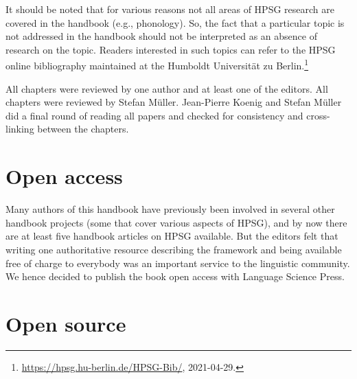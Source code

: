 \begin{refsection}
It should be noted that for various reasons not all areas of HPSG research are covered in the
handbook (e.g., phonology). So, the fact that a particular topic is not addressed in the handbook
should not be interpreted as an absence of research on the topic. Readers interested in such topics
can refer to the HPSG online bibliography maintained at the Humboldt Universität zu Berlin.\footnote{%
\url{https://hpsg.hu-berlin.de/HPSG-Bib/}, 2021-04-29.
}

All chapters were reviewed by one author and at least one of the editors. All chapters were reviewed
by Stefan Müller. Jean-Pierre Koenig and Stefan Müller did a final round of reading all papers and
checked for consistency and cross-linking between the chapters.


\section*{Open access}


Many authors of this handbook have previously been involved in several other handbook projects (some that cover various aspects of HPSG), and by now there are at least five handbook articles on HPSG available. But the editors felt that writing one authoritative resource describing the framework and being available free of charge to everybody was an important service to the linguistic community. We hence decided to publish the book open access with Language Science Press.


\section*{Open source}


\end{refsection}
